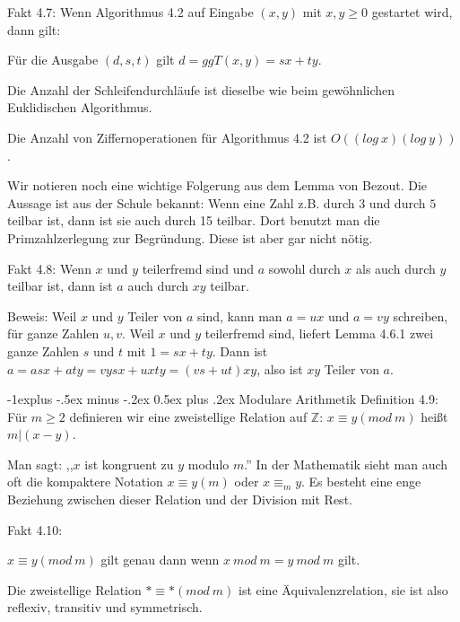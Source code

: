 \documentclass[a4paper]{article}
\makeatletter
\renewcommand{\subsection}{\@startsection{subsection}{2}{0mm}%
 {-1explus -.5ex minus -.2ex}%
 {0.5ex plus .2ex}%
 {\normalfont\normalsize\bfseries}}
\makeatother
\begin{document}
\begin{multicols}{3}
    Fakt 4.7: Wenn Algorithmus 4.2 auf Eingabe $(x,y)$ mit $x,y\geq 0$ gestartet wird, dann gilt:
    \begin{enumerate*}
        \item Für die Ausgabe $(d,s,t)$ gilt $d= ggT(x,y) =sx+ty$.
        \item Die Anzahl der Schleifendurchläufe ist dieselbe wie beim gewöhnlichen Euklidischen Algorithmus.
        \item Die Anzahl von Ziffernoperationen für Algorithmus 4.2 ist $O((log\ x)(log\ y))$.
    \end{enumerate*}

    Wir notieren noch eine wichtige Folgerung aus dem Lemma von Bezout. Die Aussage ist aus der Schule bekannt: Wenn eine Zahl z.B. durch $3$ und durch $5$ teilbar ist, dann ist sie auch durch 15 teilbar. Dort benutzt man die Primzahlzerlegung zur Begründung. Diese ist aber gar nicht nötig.

    Fakt 4.8: Wenn $x$ und $y$ teilerfremd sind und $a$ sowohl durch $x$ als auch durch $y$ teilbar ist, dann ist $a$ auch durch $xy$ teilbar.

    Beweis: Weil $x$ und $y$ Teiler von $a$ sind, kann man $a=ux$ und $a=vy$ schreiben, für ganze Zahlen $u,v$. Weil $x$ und $y$ teilerfremd sind, liefert Lemma 4.6.1 zwei ganze Zahlen $s$ und $t$ mit $1=sx+ty$. Dann ist $a=asx+aty=vysx+uxty= (vs+ut)xy$, also ist $xy$ Teiler von $a$.

    \subsection{Modulare Arithmetik}
    Definition 4.9: Für $m\geq 2$ definieren wir eine zweistellige Relation auf $\mathbb{Z}$: $x\equiv y (mod\ m)$ heißt $m|(x-y)$.

    Man sagt: ,,$x$ ist kongruent zu $y$ modulo $m$.'' In der Mathematik sieht man auch oft die kompaktere Notation $x\equiv y(m)$ oder $x\equiv_m y$. Es besteht eine enge Beziehung zwischen dieser Relation und der Division mit Rest.

    Fakt 4.10:
    \begin{enumerate*}
        \item $x\equiv y(mod\ m)$ gilt genau dann wenn $x\ mod\ m=y\ mod\ m$ gilt.
        \item Die zweistellige Relation $*\equiv *(mod\ m)$ ist eine Äquivalenzrelation, sie ist also reflexiv, transitiv und symmetrisch.
    \end{enumerate*}


\end{multicols}
\end{document}
